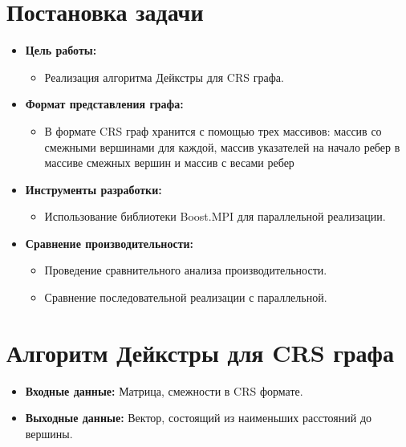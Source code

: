 \documentclass[12pt]{article}
\begin{document}
\section*{Постановка задачи}
\begin{itemize}
    \item \textbf{Цель работы:}
        \begin{itemize}
            \item Реализация алгоритма Дейкстры для CRS графа.
        \end{itemize}
    \item \textbf{Формат представления графа:}
        \begin{itemize}
           \item В формате CRS граф хранится с помощью трех массивов: массив со смежными вершинами для каждой, массив указателей на начало ребер в массиве смежных вершин и массив с весами ребер
        \end{itemize}
    \item \textbf{Инструменты разработки:}
        \begin{itemize}
             \item Использование библиотеки Boost.MPI для параллельной реализации.
        \end{itemize}
    \item \textbf{Сравнение производительности:}
         \begin{itemize}
            \item Проведение сравнительного анализа производительности.
            \item Сравнение последовательной реализации с параллельной.
         \end{itemize}
\end{itemize}
\newpage

\section*{Алгоритм Дейкстры для CRS графа}

\begin{itemize}
    \item[] \textbf{Входные данные:} Матрица, смежности в CRS формате.
    \item[] \textbf{Выходные данные:} Вектор, состоящий из наименьших расстояний до вершины.
\end{itemize}
\end{document}
